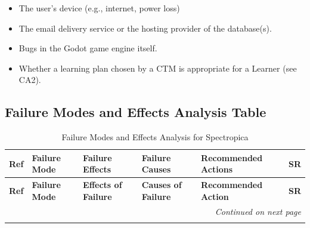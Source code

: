 \documentclass{article}
\begin{document}
\begin{itemize}
    \item The user's device (e.g., internet, power loss)
    \item The email delivery service or the hosting provider of the database(s).
    \item Bugs in the Godot game engine itself.
    \item Whether a learning plan chosen by a CTM is appropriate for a Learner (see CA2).
\end{itemize}

\subsection{Failure Modes and Effects Analysis Table}

\begin{landscape}
\setlength{\tabcolsep}{4pt}
\footnotesize
\begin{longtable}{p{1.0cm} p{3.1cm} p{3.9cm} p{3.9cm} p{5.2cm} p{2.5cm}}
\caption{Failure Modes and Effects Analysis for Spectropica}\label{tab:fmea}\\
\toprule
\textbf{Ref} & \textbf{Failure Mode} & \textbf{Failure Effects} & \textbf{Failure Causes} & \textbf{Recommended Actions} & \textbf{SR}\\
\midrule
\endfirsthead
\toprule
\textbf{Ref} & \textbf{Failure Mode} & \textbf{Effects of Failure} & \textbf{Causes of Failure} & \textbf{Recommended Action} & \textbf{SR}\\
\midrule
\endhead
\midrule
\multicolumn{6}{r}{\textit{Continued on next page}}\\
\endfoot
\bottomrule
\endlastfoot


\end{longtable}
\end{landscape}
\end{document}
